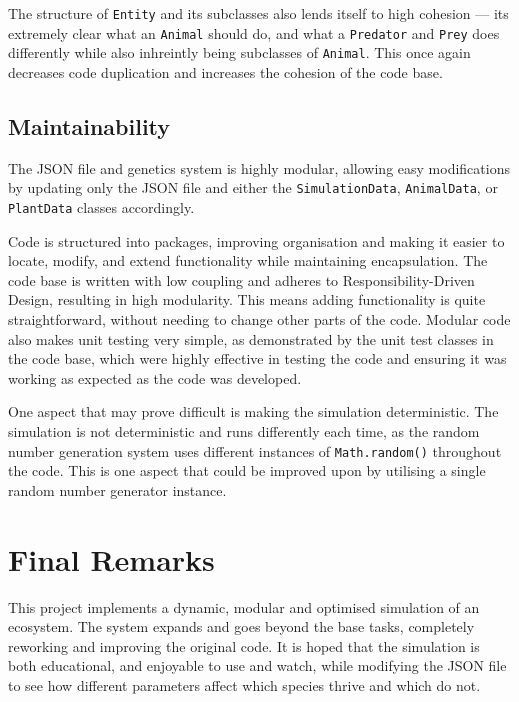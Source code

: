 \documentclass[10pt, a4paper]{scrartcl}
\begin{document}
\begin{multicols}{2}
        \noindent The structure of \verb|Entity| and its subclasses also lends itself to high cohesion — its extremely clear what an
        \verb|Animal| should do, and what a \verb|Predator| and \verb|Prey| does differently while also inhreintly being subclasses of
        \verb|Animal|. This once again decreases code duplication and increases the cohesion of the code base.

        \noindent 

        \subsection{Maintainability}
        \noindent The JSON file and genetics system is highly modular, allowing easy modifications by updating only the JSON file and either the
        \verb|SimulationData|, \verb|AnimalData|, or \verb|PlantData| classes accordingly.

        \noindent Code is structured into packages, improving organisation and making it easier to locate, modify, and extend
        functionality while maintaining encapsulation. The code base is written with low coupling and adheres to Responsibility-Driven Design,
        resulting in high modularity. This means adding functionality is quite straightforward, without needing to change other parts 
        of the code. Modular code also makes unit testing very simple, as demonstrated by the unit test classes in the code base, which 
        were highly effective in testing the code and ensuring it was working as expected as the code was developed.

        \noindent One aspect that may prove difficult is making the simulation deterministic. The simulation is not deterministic
        and runs differently each time, as the random number generation system uses different instances of \verb|Math.random()| throughout
        the code. This is one aspect that could be improved upon by utilising a single random number generator instance.

        \section{Final Remarks}
        \noindent This project implements a dynamic, modular and optimised simulation of an ecosystem. The system expands and goes
        beyond the base tasks, completely reworking and improving the original code. It is hoped that the simulation is both
        educational, and enjoyable to use and watch, while modifying the JSON file to see how different parameters affect which 
        species thrive and which do not.

    \end{multicols}
\end{document}
